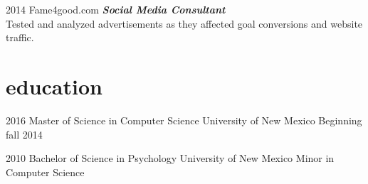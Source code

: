 \documentclass[]{friggeri-cv} %
\begin{document}
\begin{entrylist}
\entry
{\footnotesize{2014}}
{Fame4good.com}
{}
{\textbf{\emph{Social Media Consultant}} \\
Tested and analyzed advertisements as they affected goal conversions and website traffic.}
\end {entrylist}


\section{education}
\begin{entrylist}
\entry
{2016}
{Master of Science {\normalfont in Computer Science}}
{University of New Mexico}
{Beginning fall 2014}
\end{entrylist}

\begin{entrylist}
\entry
{2010}
{Bachelor of Science {\normalfont in Psychology}}
{University of New Mexico}
{Minor in Computer Science}
\end{entrylist}

\end{document}
